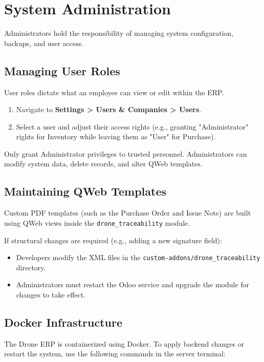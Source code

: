 \section{System Administration}

Administrators hold the responsibility of managing system configuration, backups, and user access.

\subsection{Managing User Roles}
User roles dictate what an employee can view or edit within the ERP.
\begin{enumerate}
    \item Navigate to \textbf{Settings > Users \& Companies > Users}.
    \item Select a user and adjust their access rights (e.g., granting "Administrator" rights for Inventory while leaving them as "User" for Purchase).
\end{enumerate}

\begin{alertbox}
    Only grant Administrator privileges to trusted personnel. Administrators can modify system data, delete records, and alter QWeb templates.
\end{alertbox}

\subsection{Maintaining QWeb Templates}
Custom PDF templates (such as the Purchase Order and Issue Note) are built using QWeb views inside the \texttt{drone\_traceability} module.

If structural changes are required (e.g., adding a new signature field):
\begin{itemize}
    \item Developers modify the XML files in the \texttt{custom-addons/drone\_traceability} directory.
    \item Administrators must restart the Odoo service and upgrade the module for changes to take effect.
\end{itemize}

\subsection{Docker Infrastructure}
The Drone ERP is containerized using Docker. To apply backend changes or restart the system, use the following commands in the server terminal:


